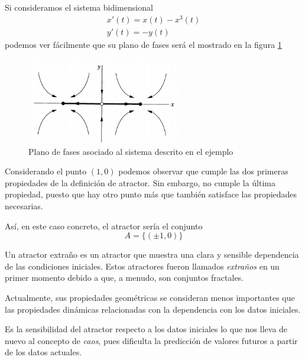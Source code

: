 \begin{example}
Si consideramos el sistema bidimensional
\[\begin{array}{l}
x'(t) = x(t)-x^3(t) \\
y'(t) = -y(t)
\end{array}\]
podemos ver fácilmente que su plano de fases será el mostrado en la figura \ref{fig:planoFasesAtractorEjemplo}
\begin{figure}[H]
\centering
\includegraphics[width = 0.6\textwidth]{img/atractorExample.png}
\caption{Plano de fases asociado al sistema descrito en el ejemplo}
\label{fig:planoFasesAtractorEjemplo}
\end{figure}

Considerando el punto $(1,0)$ podemos observar que cumple las dos primeras propiedades de la definición de atractor. Sin embargo, no cumple la última propiedad, puesto que hay otro punto más que también satisface las propiedades necesarias.

Así, en este caso concreto, el atractor sería el conjunto
\[A=\{(\pm 1, 0)\}\]
\end{example}

\begin{definition}
Un atractor extraño es un atractor que muestra una clara y sensible dependencia de las condiciones iniciales. Estos atractores fueron llamados \emph{extraños} en un primer momento debido a que, a menudo, son conjuntos fractales.

Actualmente, sus propiedades geométricas se consideran menos importantes que las propiedades dinámicas relacionadas con la dependencia con los datos iniciales.
\end{definition}

Es la sensibilidad del atractor respecto a los datos iniciales lo que nos lleva de nuevo al concepto de \emph{caos}, pues dificulta la predicción de valores futuros a partir de los datos actuales.

